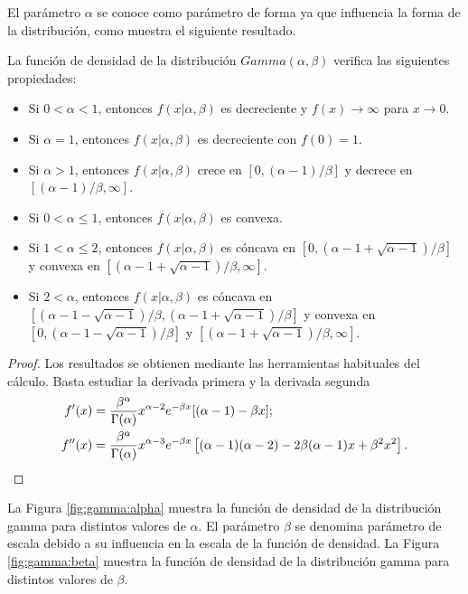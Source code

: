 \documentclass{article}
\begin{document}
El parámetro $\alpha$ se conoce como parámetro de forma ya que influencia la forma de la distribución, como muestra el siguiente resultado.

\begin{prop}
    La función de densidad de la distribución $Gamma(\alpha, \beta)$ verifica las siguientes propiedades:
    \begin{itemize}
        \item Si $0< \alpha <1$, entonces $f(x | \alpha, \beta)$ es decreciente y $f(x) \to \infty$ para $x \to 0$.
        \item Si $\alpha = 1$, entonces $f(x | \alpha, \beta)$ es decreciente con $f(0) = 1$.
        \item Si $\alpha > 1$, entonces $f(x | \alpha, \beta)$ crece en $[0, (\alpha-1) / \beta]$ y decrece en $[(\alpha-1) / \beta,\infty]$.
        \item Si $0 < \alpha \le 1$, entonces $f(x | \alpha, \beta)$ es convexa.
        \item Si $1 < \alpha \le 2$, entonces $f(x | \alpha, \beta)$ es cóncava en $[0,(\alpha-1 + \sqrt{\alpha - 1}) / \beta]$ y convexa en $[(\alpha-1 + \sqrt{\alpha - 1}) / \beta, \infty]$.
        \item Si $2 < \alpha$, entonces $f(x | \alpha, \beta)$ es cóncava en $[(\alpha-1 - \sqrt{\alpha - 1}) / \beta,(\alpha-1 + \sqrt{\alpha - 1}) / \beta]$ y convexa en $[0, (\alpha-1 - \sqrt{\alpha - 1}) / \beta]$ y $[(\alpha-1 + \sqrt{\alpha - 1}) / \beta, \infty]$.
    \end{itemize}
\end{prop}
\begin{proof}
Los resultados se obtienen mediante las herramientas habituales del cálculo. Basta estudiar la derivada primera y la derivada segunda
\begin{align*}
f^\prime(x) &= \frac{\beta^\alpha}{\Gamma(\alpha)} x^{\alpha-2} e^{-\beta x}[(\alpha - 1) - \beta x]; \\
f^{\prime \prime}(x) &= \frac{\beta^\alpha}{\Gamma(\alpha)} x^{\alpha-3} e^{-\beta x} \left[(\alpha - 1)(\alpha - 2) - 2 \beta (\alpha - 1) x + \beta^2 x^2\right]. \qedhere
\end{align*}
\end{proof}

La Figura \ref{fig:gamma:alpha} muestra la función de densidad de la distribución gamma para distintos valores de $\alpha$.  El parámetro $\beta$ se denomina parámetro de escala debido a su influencia en la escala de la función de densidad. La Figura \ref{fig:gamma:beta} muestra la función de densidad de la distribución gamma para distintos valores de $\beta$.
\end{document}
